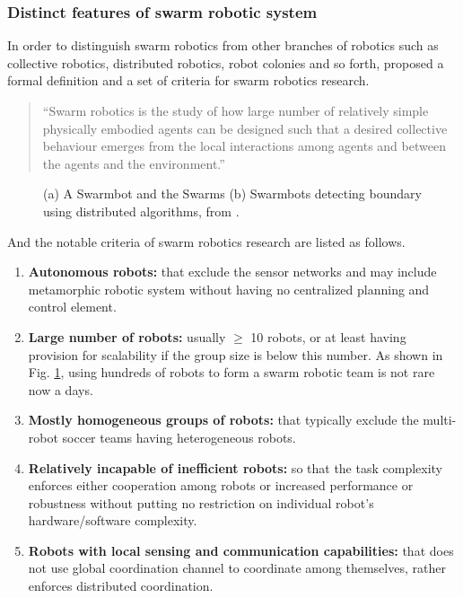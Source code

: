 \subsubsection*{Distinct features of swarm robotic system}
In order to distinguish swarm robotics from other branches of robotics such as collective robotics, distributed robotics, robot colonies and so forth,  proposed a formal definition and a set of criteria for swarm robotics research. 
\begin{quote}
\ssp
``Swarm robotics is the study of how large number of relatively simple physically embodied agents can be designed such that a desired collective behaviour emerges from the local interactions among agents and between the agents and the environment.'' 
\end{quote}
\sdp
\begin{figure}[H]
\centering
{} 
\hspace{0.25cm}
\caption{ (a) A Swarmbot and the Swarms 
 (b) Swarmbots detecting boundary using distributed algorithms, from \protect{}.}
\label{fig:swarmbot-boundary-detection}
\end{figure}

And the notable criteria of swarm robotics research are listed as follows.
\begin{enumerate}
\item \textbf{Autonomous robots: }
that exclude the sensor networks and may include metamorphic robotic system without having no centralized planning and control element.
\item \textbf{Large number of robots: }
usually $\geq$ 10 robots, or at least having provision for scalability if the group size is below this number. As shown in Fig. \ref{fig:swarmbot-boundary-detection}, using hundreds of robots to form a swarm robotic team is not rare now a days.
\item \textbf{Mostly homogeneous groups of robots: }
that typically exclude the multi-robot soccer teams having heterogeneous robots.
\item\textbf{ Relatively incapable of inefficient robots: }
so that the task complexity enforces either cooperation among robots or increased performance or robustness without putting no restriction on individual robot's hardware/software complexity.
\item \textbf{Robots with local sensing and communication capabilities: } 
that does not use global coordination channel to coordinate among themselves, rather enforces distributed coordination.
\end{enumerate}
